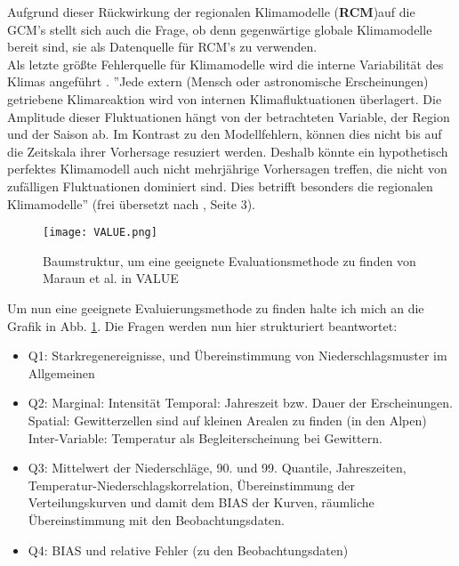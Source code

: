 Aufgrund dieser Rückwirkung der regionalen Klimamodelle (\textbf{RCM})auf die GCM's stellt sich auch die Frage, ob denn gegenwärtige globale Klimamodelle bereit sind, sie als Datenquelle für RCM's zu verwenden.\\
Als letzte größte Fehlerquelle für Klimamodelle wird die interne Variabilität des Klimas angeführt \cite[vgl.][]{maraun_2013}. ''Jede extern (Mensch oder astronomische Erscheinungen) getriebene Klimareaktion wird von internen Klimafluktuationen überlagert. Die Amplitude dieser Fluktuationen hängt von der betrachteten Variable, der Region und der Saison ab. Im Kontrast zu den Modellfehlern, können dies nicht bis auf die Zeitskala ihrer Vorhersage resuziert werden. Deshalb könnte ein hypothetisch perfektes Klimamodell auch nicht mehrjährige Vorhersagen treffen, die nicht von zufälligen Fluktuationen dominiert sind. Dies betrifft besonders die regionalen Klimamodelle'' (frei übersetzt nach \cite{maraun_value}, Seite 3).\\
\begin{figure}
	\centering
	\texttt{[image: VALUE.png]}
	\caption{Baumstruktur, um eine geeignete Evaluationsmethode zu finden von Maraun et al. in VALUE \cite{maraun_value}}
	\label{fig:value}
\end{figure}
Um nun eine geeignete Evaluierungsmethode zu finden halte ich mich an die Grafik in Abb. \ref{fig:value}. Die Fragen werden nun hier strukturiert beantwortet:
\begin{itemize}
	\item Q1: Starkregenereignisse, und Übereinstimmung von Niederschlagsmuster im Allgemeinen
	\item Q2:
		\subitem Marginal: Intensität
		\subitem Temporal: Jahreszeit bzw. Dauer der Erscheinungen.
		\subitem Spatial: Gewitterzellen sind auf kleinen Arealen zu finden (in den Alpen)
		\subitem Inter-Variable: Temperatur als Begleiterscheinung bei Gewittern.
	\item Q3: Mittelwert der Niederschläge, 90. und 99. Quantile, Jahreszeiten, Temperatur-Niederschlagskorrelation, Übereinstimmung der Verteilungskurven und damit dem BIAS der Kurven, räumliche Übereinstimmung mit den Beobachtungsdaten.
	\item Q4: BIAS und relative Fehler (zu den Beobachtungsdaten)
\end{itemize}





